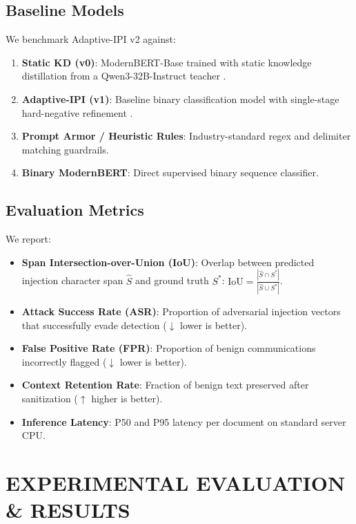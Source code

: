 \documentclass[conference]{IEEEtran}
\begin{document}
\subsection{Baseline Models}

We benchmark Adaptive-IPI v2 against:
\begin{enumerate}
    \item \textbf{Static KD (v0)}: ModernBERT-Base trained with static knowledge distillation from a Qwen3-32B-Instruct teacher \cite{ref3}.
    \item \textbf{Adaptive-IPI (v1)}: Baseline binary classification model with single-stage hard-negative refinement \cite{ref1}.
    \item \textbf{Prompt Armor / Heuristic Rules}: Industry-standard regex and delimiter matching guardrails.
    \item \textbf{Binary ModernBERT}: Direct supervised binary sequence classifier.
\end{enumerate}

\subsection{Evaluation Metrics}

We report:
\begin{itemize}
    \item \textbf{Span Intersection-over-Union (IoU)}: Overlap between predicted injection character span $\hat{S}$ and ground truth $S^*$: $\text{IoU} = \frac{|\hat{S} \cap S^*|}{|\hat{S} \cup S^*|}$.
    \item \textbf{Attack Success Rate (ASR)}: Proportion of adversarial injection vectors that successfully evade detection ($\downarrow$ lower is better).
    \item \textbf{False Positive Rate (FPR)}: Proportion of benign communications incorrectly flagged ($\downarrow$ lower is better).
    \item \textbf{Context Retention Rate}: Fraction of benign text preserved after sanitization ($\uparrow$ higher is better).
    \item \textbf{Inference Latency}: P50 and P95 latency per document on standard server CPU.
\end{itemize}

\section{EXPERIMENTAL EVALUATION \& RESULTS}
\end{document}

